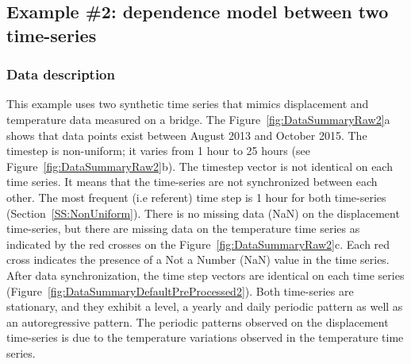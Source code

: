 \subsection{Example \#2: dependence model between two time-series}
\label{S:ExampleDispTemp}

\subsubsection{Data description}

This example uses two synthetic time series that mimics displacement and temperature data measured on a bridge.
The  Figure~\ref{fig:DataSummaryRaw2}a shows that data points exist between August 2013 and October 2015.
The timestep is non-uniform; it varies from 1 hour to 25 hours (see Figure~\ref{fig:DataSummaryRaw2}b). 
The timestep vector is not identical on each time series. 
It means that the time-series are not synchronized between each other.
The most frequent (i.e referent) time step is 1 hour for both time-series (Section~\ref{SS:NonUniform}).
There is no missing data (NaN) on the displacement time-series, but there are missing data on the temperature time series as indicated by the red crosses on the Figure~\ref{fig:DataSummaryRaw2}c.
Each red cross indicates the presence of a Not a Number (NaN) value in the time series.
After data synchronization, the time step vectors are identical on each time series (Figure~\ref{fig:DataSummaryDefaultPreProcessed2}).
Both time-series are stationary, and they exhibit a level, a yearly and daily periodic pattern as well as an autoregressive pattern.
The periodic patterns observed on the displacement time-series is due to the temperature variations observed in the temperature time series.


